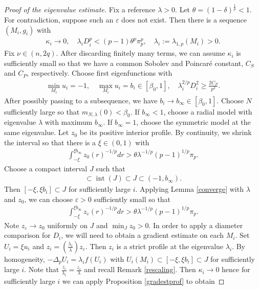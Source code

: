 \documentclass[11pt]{amsart}
\def \eps {\varepsilon}
\DeclareMathOperator{\Int}{int}
\theoremstyle{definition}
\begin{document}
\begin{proof}[Proof of the eigenvalue estimate]
    Fix a reference $\lambda>0$.  Let $\theta=(1-\delta)^{\frac{1}{p}}<1$. For contradiction, suppose such an $\eps$ does not exist.  Then there is a sequence $(M_i,g_i)$ with
    \begin{align*}
        \kappa_i\to 0, \quad \lambda_iD_i^p<(p-1)\theta^p\pi_p^p, \quad \lambda_i:=\lambda_{1,p}(M_i)>0.
    \end{align*}
    Fix $\nu \in (n,2q)$.  After discarding finitely many terms, we can assume $\kappa_i$ is sufficiently small so that we have a common Sobolev and Poincar\'e constant, $C_S$ and $C_P$, respectively. Choose first eigenfunctions with
    \begin{align*}
        \min_{M_i}u_i=-1, \quad \max_{M_i}u_i=b_i\in[\beta_0,1],\quad \lambda_i^{2/p}D_i^2\geq \frac{2C_P}{p^2}.
    \end{align*}
    After possibly passing to a subsequence, we have $b_i\to b_\infty \in [\beta_0,1]$. Choose $N$ sufficiently large so that $m_{N,\lambda}(0)<\beta_0$.  If $b_\infty <1$, choose a radial model with eigenvalue $\lambda$ with maximum $b_\infty$.  If $b_\infty=1$, choose the symmetric model at the same eigenvalue.  Let $z_0$ be its positive interior profile.  By continuity, we shrink the interval so that there is a $\xi\in (0,1)$ with
    \begin{align*}
        \int_{-\xi}^{\xi b_\infty}z_0(r)^{-1/p}dr>\theta \lambda^{-1/p}(p-1)^{1/p}\pi_p.
    \end{align*}
    Choose a compact interval $J$ such that
    \begin{align*}
        [-\xi,\xi b_\infty]\subset \Int (J) \subset J\subset (-1,b_\infty).
    \end{align*}
    Then $[-\xi,\xi b_i]\subset J$ for sufficiently large $i$.
    Applying Lemma \ref{converge} with $\lambda$ and $z_0$, we can choose $\eps>0$ sufficiently small so that
    \begin{align*}
         \int_{-\xi}^{\xi b_\infty}z_\eps(r)^{-1/p}dr>\theta \lambda^{-1/p}(p-1)^{1/p}\pi_p.
    \end{align*}
    Note $z_\eps \to z_0$ uniformly on $J$ and $\min_J z_0>0$. 
In order to apply a diameter comparison for $D_i$, we will need to obtain a gradient estimate on each $M_i$.  Set $U_i=\xi u_i$ and $z_i=\left(\frac{\lambda_i}{\lambda}\right)z_\eps$.  Then $z_i$ is a strict profile at the eigenvalue $\lambda_i$.  By homogeneity, $-\Delta_pU_i=\lambda_i f(U_i)$ with $U_i(M_i)\subset [-\xi,\xi b_i]\subset J$ for sufficiently large $i$.  Note that $\frac{z_i}{\lambda_i}=\frac{z_\eps}{\lambda}$ and recall Remark \ref{rescaling}. Then $\kappa_i\to 0$ hence for sufficiently large $i$ we can apply Proposition \ref{gradestprof} to obtain

\end{proof}
\end{document}
